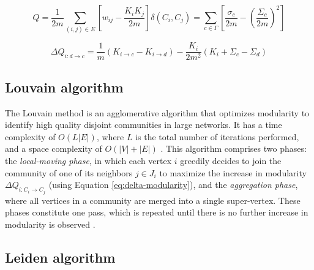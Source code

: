 \begin{equation}
\label{eq:modularity}
  Q
  = \frac{1}{2m} \sum_{(i, j) \in E} \left[w_{ij} - \frac{K_i K_j}{2m}\right] \delta(C_i, C_j)
  = \sum_{c \in \Gamma} \left[\frac{\sigma_c}{2m} - \left(\frac{\Sigma_c}{2m}\right)^2\right]
\end{equation}

\begin{equation}
\label{eq:delta-modularity}
  \Delta Q_{i: d \rightarrow c}
  = \frac{1}{m} (K_{i \rightarrow c} - K_{i \rightarrow d}) - \frac{K_i}{2m^2} (K_i + \Sigma_c - \Sigma_d)
\end{equation}




\subsection{Louvain algorithm}
\label{sec:about-louvain}

The Louvain method \cite{com-blondel08} is an agglomerative algorithm that optimizes modularity to identify high quality disjoint communities in large networks. It has a time complexity of $O (L |E|)$, where $L$ is the total number of iterations performed, and a space complexity of $O(|V| + |E|)$ \cite{com-lancichinetti09}. This algorithm comprises two phases: the \textit{local-moving phase}, in which each vertex $i$ greedily decides to join the community of one of its neighbors $j \in J_i$ to maximize the increase in modularity $\Delta Q_{i:C_i \rightarrow C_j}$ (using Equation \ref{eq:delta-modularity}), and the \textit{aggregation phase}, where all vertices in a community are merged into a single super-vertex. These phases constitute one pass, which is repeated until there is no further increase in modularity is observed \cite{com-blondel08, com-leskovec21}.




\subsection{Leiden algorithm}
\label{sec:about-leiden}

